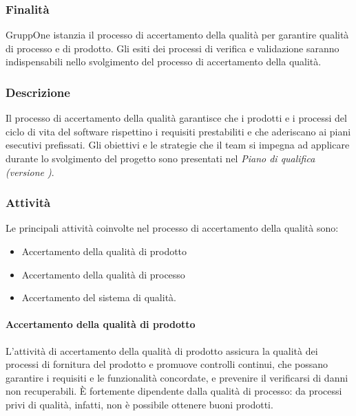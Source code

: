 \documentclass[../../norme-di-progetto.tex]{subfiles}
\begin{document}
\subsubsection{Finalità}%
\label{subs:accertamento_della_qualita/finalita}

GruppOne istanzia il processo di accertamento della qualità per garantire qualità di processo e di prodotto.
Gli esiti dei processi di verifica e validazione saranno indispensabili nello svolgimento del processo di accertamento della qualità.

\subsubsection{Descrizione}%
\label{subs:accertamento_della_qualita/descrizione}

Il processo di accertamento della qualità garantisce che i prodotti e i processi del ciclo di vita del software rispettino i requisiti prestabiliti e che aderiscano ai piani esecutivi prefissati.
Gli obiettivi e le strategie che il team si impegna ad applicare durante lo svolgimento del progetto sono presentati nel \textit{Piano di qualifica (versione \versione)}.

\subsubsection{Attività}%
\label{subs:accertamento_della_qualita/attivita}

Le principali attività coinvolte nel processo di accertamento della qualità sono:

\begin{itemize}
  \item Accertamento della qualità di prodotto
  \item Accertamento della qualità di processo
  \item Accertamento del sistema di qualità.
\end{itemize}

\paragraph{Accertamento della qualità di prodotto}%
\label{par:accertamento_della_qualita_di_prodotto/attivita}
L'attività di accertamento della qualità di prodotto assicura la qualità dei processi di fornitura del prodotto e promuove controlli continui, che possano garantire i requisiti e le funzionalità concordate, e prevenire il verificarsi di danni non recuperabili.
È fortemente dipendente dalla qualità di processo: da processi privi di qualità, infatti, non è possibile ottenere buoni prodotti.
\end{document}
